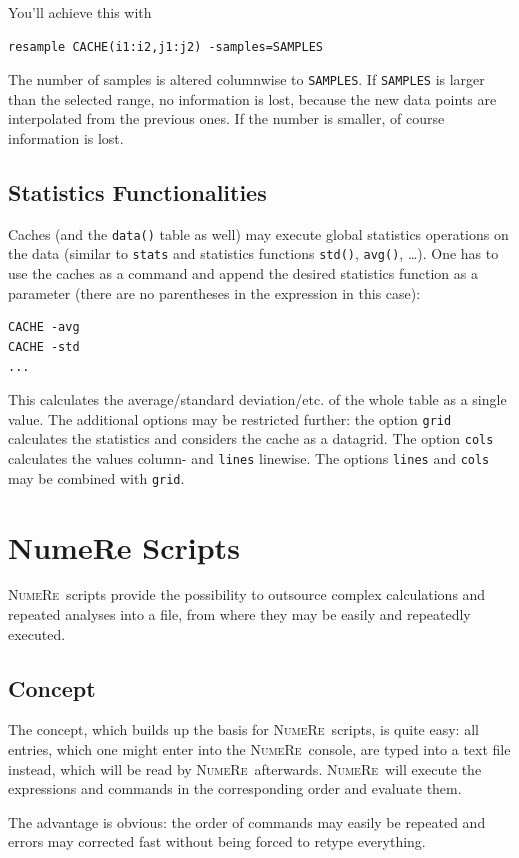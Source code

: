 \documentclass[DIV=14,headsepline,footsepline]{scrbook}
\newcommand{\NR}{\textsc{Nu\-me\-Re}}
\begin{document}
				You'll achieve this with
				\begin{lstlisting}
resample CACHE(i1:i2,j1:j2) -samples=SAMPLES
				\end{lstlisting}
				The number of samples is altered columnwise to \lstinline+SAMPLES+. If \lstinline+SAMPLES+ is larger than the selected range, no information is lost, because the new data points are interpolated from the previous ones. If the number is smaller, of course information is lost.
				
			\section{Statistics Functionalities}
				Caches (and the \lstinline+data()+ table as well) may execute global statistics operations on the data (similar to \lstinline+stats+ and statistics functions \lstinline+std()+, \lstinline+avg()+, \ldots). One has to use the caches as a command and append the desired statistics function as a parameter (there are no parentheses in the expression in this case):
				\begin{lstlisting}
CACHE -avg
CACHE -std
...
				\end{lstlisting}
				This calculates the average/standard deviation/etc. of the whole table as a single value. The additional options may be restricted further: the option \lstinline+grid+ calculates the statistics and considers the cache as a datagrid. The option \lstinline+cols+ calculates the values column- and \lstinline+lines+ linewise. The options \lstinline+lines+ and \lstinline+cols+ may be combined with \lstinline+grid+.
		\chapter{NumeRe Scripts}
			\NR\ scripts provide the possibility to outsource complex calculations and repeated analyses into a file, from where they may be easily and repeatedly executed.
			\section{Concept}
				The concept, which builds up the basis for \NR\ scripts, is quite easy: all entries, which one might enter into the \NR\ console, are typed into a text file instead, which will be read by \NR\ afterwards. \NR\ will execute the expressions and commands in the corresponding order and evaluate them.
				
				The advantage is obvious: the order of commands may easily be repeated and errors may corrected fast without being forced to retype everything.
\end{document}
